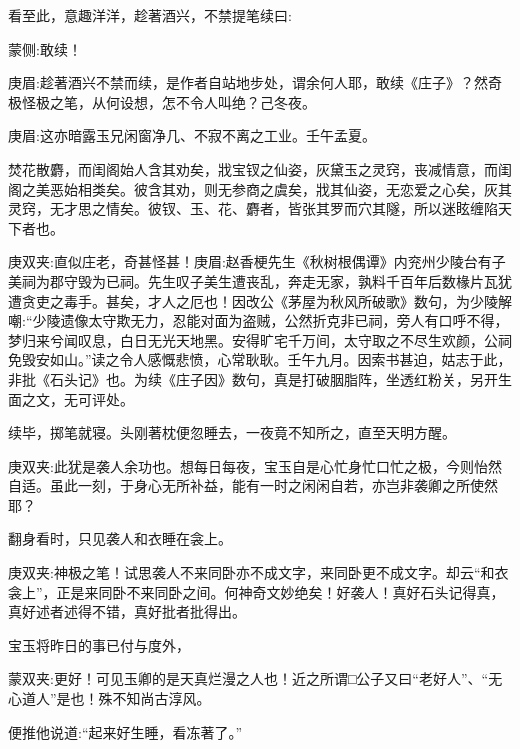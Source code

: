 \begin{parag}
    看至此，意趣洋洋，趁著酒兴，不禁提笔续曰:\begin{note}蒙侧:敢续！\end{note}\begin{note}庚眉:趁著酒兴不禁而续，是作者自站地步处，谓余何人耶，敢续《庄子》？然奇极怪极之笔，从何设想，怎不令人叫绝？己冬夜。\end{note}\begin{note}庚眉:这亦暗露玉兄闲窗净几、不寂不离之工业。壬午孟夏。\end{note}
\end{parag}


\begin{qute2sp}

    焚花散麝，而闺阁始人含其劝矣，戕宝钗之仙姿，灰黛玉之灵窍，丧减情意，而闺阁之美恶始相类矣。彼含其劝，则无参商之虞矣，戕其仙姿，无恋爱之心矣，灰其灵窍，无才思之情矣。彼钗、玉、花、麝者，皆张其罗而穴其隧，所以迷眩缠陷天下者也。\begin{note}庚双夹:直似庄老，奇甚怪甚！庚眉:赵香梗先生《秋树根偶谭》内兖州少陵台有子美祠为郡守毁为已祠。先生叹子美生遭丧乱，奔走无家，孰料千百年后数椽片瓦犹遭贪吏之毒手。甚矣，才人之厄也！因改公《茅屋为秋风所破歌》数句，为少陵解嘲:“少陵遗像太守欺无力，忍能对面为盗贼，公然折克非已祠，旁人有口呼不得，梦归来兮闻叹息，白日无光天地黑。安得旷宅千万间，太守取之不尽生欢颜，公祠免毁安如山。”读之令人感慨悲愤，心常耿耿。壬午九月。因索书甚迫，姑志于此，非批《石头记》也。为续《庄子因》数句，真是打破胭脂阵，坐透红粉关，另开生面之文，无可评处。\end{note}
\end{qute2sp}


\begin{parag}
    续毕，掷笔就寝。头刚著枕便忽睡去，一夜竟不知所之，直至天明方醒。\begin{note}庚双夹:此犹是袭人余功也。想每日每夜，宝玉自是心忙身忙口忙之极，今则怡然自适。虽此一刻，于身心无所补益，能有一时之闲闲自若，亦岂非袭卿之所使然耶？\end{note}翻身看时，只见袭人和衣睡在衾上。\begin{note}庚双夹:神极之笔！试思袭人不来同卧亦不成文字，来同卧更不成文字。却云“和衣衾上”，正是来同卧不来同卧之间。何神奇文妙绝矣！好袭人！真好石头记得真，真好述者述得不错，真好批者批得出。\end{note}宝玉将昨日的事已付与度外，\begin{note}蒙双夹:更好！可见玉卿的是天真烂漫之人也！近之所谓□公子又曰“老好人”、“无心道人”是也！殊不知尚古淳风。\end{note}便推他说道:“起来好生睡，看冻著了。”
\end{parag}


